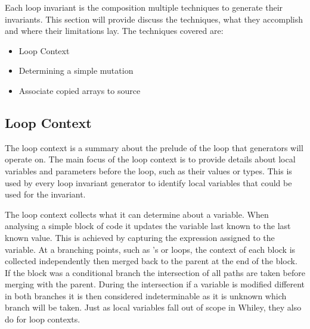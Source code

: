 Each loop invariant is the composition multiple techniques to generate their
invariants. This section will provide discuss the techniques, what they
accomplish and where their limitations lay.
The techniques covered are:

\begin{itemize}
	\item{Loop Context}
	\item{Determining a simple mutation}
	\item{Associate copied arrays to source}
\end{itemize}

\subsection{Loop Context}\label{s:loop-context}


The loop context is a summary about the prelude of the loop
that generators will operate on.
The main focus of the loop context is to provide details about
local variables and parameters before the loop, such as their
values or types.
This is used by every loop invariant generator to identify local variables
that could be used for the invariant.

The loop context collects what it can determine about a variable.
When analysing a simple block of code it updates the variable last known to
the last known value. This is achieved by capturing the expression
assigned to the variable.
At a branching points, such as 's or loops, the context of each 
block is collected independently then merged back to the parent at the end of the block.
If the block was a conditional branch the intersection of all paths are taken
before merging with the parent.
During the intersection if a variable is modified different in both branches it
is then considered indeterminable as it is unknown which branch will be taken.
Just as local variables fall out of scope in Whiley, they also do for loop contexts.

